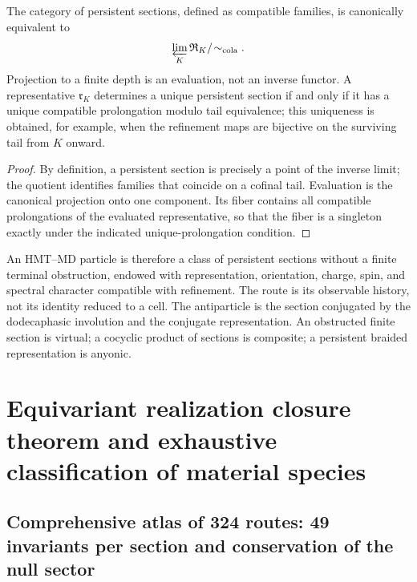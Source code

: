\begin{theorem}
The category of persistent sections, defined as compatible families,
is canonically equivalent to
\[
 \varprojlim_K\mathfrak R_K/\!\sim_{\rm cola}.
\]
Projection to a finite depth is an evaluation, not an inverse functor. A representative \(\mathfrak r_K\) determines a unique persistent section if and only if it has a unique compatible prolongation modulo tail equivalence; this uniqueness is obtained, for example, when the refinement maps are bijective on the surviving tail from \(K\) onward.
\end{theorem}

\begin{proof}
By definition, a persistent section is precisely a point of the inverse
limit; the quotient identifies families that coincide on a cofinal tail.
Evaluation is the canonical projection onto one component. Its fiber contains
all compatible prolongations of the evaluated representative, so that the fiber
is a singleton exactly under the indicated unique-prolongation condition.
\end{proof}

An HMT--MD particle is therefore a class of persistent sections without a finite terminal obstruction, endowed with representation, orientation, charge, spin, and spectral character compatible with refinement. The route is its observable history, not its identity reduced to a cell. The antiparticle is the section conjugated by the dodecaphasic involution and the conjugate representation. An obstructed finite section is virtual; a cocyclic product of sections is composite; a persistent braided representation is anyonic.

\section{Equivariant realization closure theorem and exhaustive classification of material species}

\subsection{Comprehensive atlas of 324 routes: 49 invariants per section and conservation of the null sector}

